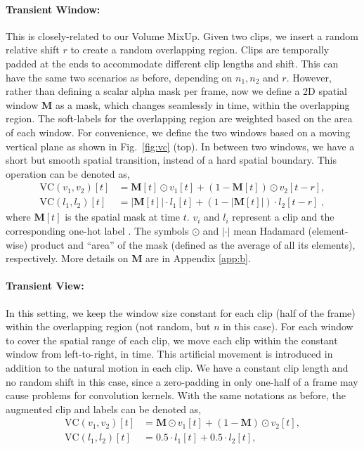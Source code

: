\documentclass[10pt,twocolumn,letterpaper]{article}
\newcommand{\fref}[1]{Fig.~\ref{#1}}
\begin{document}
\paragraph{Transient Window:} This is closely-related to our Volume MixUp. Given two clips, we insert a random relative shift $r$ to create a random overlapping region. Clips are temporally padded at the ends to accommodate different clip lengths and shift. This can have the same two scenarios as before, depending on $n_1, n_2$ and $r$. However, rather than defining a scalar alpha mask per frame, now we define a 2D spatial window $\mathbf{M}$ as a mask, which changes seamlessly in time, within the overlapping region. The soft-labels for the overlapping region are weighted based on the area of each window. For convenience, we define the two windows based on a moving vertical plane as shown in \fref{fig:vc} (top). In between two windows, we have a short but smooth spatial transition, instead of a hard spatial boundary. This operation can be denoted as,
{\small
	\begin{align*}
		\text{VC}(v_1,v_2)[t] &= \mathbf{M}[t] \odot v_1[t] + (1-\mathbf{M}[t]) \odot v_2[t-r],\\
		\text{VC}(l_1,l_2)[t] &= |\mathbf{M}[t]| \cdot l_1[t] + (1-|\mathbf{M}[t]|) \cdot l_2[t-r]\;,
	\end{align*}
}%
where $\mathbf{M}[t]$ is the spatial mask at time $t$. $v_i$ and $l_i$ represent a clip and the corresponding one-hot label . The symbols $\odot$ and $|\cdot|$ mean Hadamard (element-wise) product and ``area'' of the mask (defined as the average of all its elements), respectively. More details on $\mathbf{M}$ are in Appendix \ref{app:b}. 

\paragraph{Transient View:} In this setting, we keep the window size constant for each clip (half of the frame) within the overlapping region (not random, but $n$ in this case). For each window to cover the spatial range of each clip, we move each clip within the constant window from left-to-right, in time. This artificial movement is introduced in addition to the natural motion in each clip. We have a constant clip length and no random shift in this case, since a zero-padding in only one-half of a frame may cause problems for convolution kernels. With the same notations as before, the augmented clip and labels can be denoted as,
{\small
	\begin{align*}
		\text{VC}(v_1,v_2)[t] &= \mathbf{M} \odot v_1[t] + (1-\mathbf{M}) \odot v_2[t],\\
		\text{VC}(l_1,l_2)[t] &= 0.5 \cdot l_1[t] + 0.5 \cdot l_2[t],
	\end{align*}
}%
\end{document}
